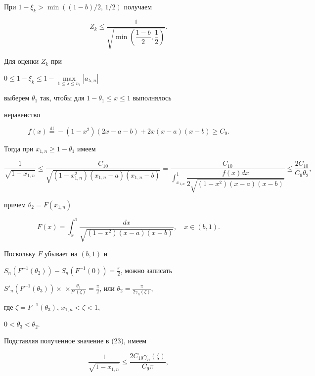 При $1-\xi_k>\min((1-b)/2,\,1/2)$ получаем


\begin{equation}


Z_k\le\frac{1}{\sqrt{\min\left(\dfrac{1-b}{2},\dfrac{1}{2}\right)}}.


\end{equation}


Для оценки $Z_k$ при


$0\le 1-\xi_k\le 1-\max\limits_{1\le\lambda\le n_1}|a_{\lambda,n}|$


выберем $\theta_1$ так, чтобы для $1-\theta_1\le x\le 1$ выполнялось


неравенство


$$


f(x)\overset{\text{df}}{=}{}-(1-x^2)(2x-a-b)+2x(x-a)(x-b)\ge C_9.


$$


Тогда при $x_{1,n}\ge 1-\theta_1$ имеем


\begin{equation}


\frac{1}{\sqrt{1-x_{1,n}}}\le


\frac{C_{10}}{\sqrt{(1-x^2_{1,n})(x_{1,n}-a)(x_{1,n}-b)}}=


\frac{C_{10}}{\displaystyle\int^1_{x_{1,n}}\dfrac{f(x)dx}


{2\sqrt{(1-x^2)(x-a)(x-b)}}}\le\frac{2C_{10}}{C_9\theta_2},


\end{equation}


причем $\theta_2=F(x_{1,n})$


$$


F(x)=\int^1_x\frac{dx}{\sqrt{(1-x^2)(x-a)(x-b)}},\quad x\in(b,1).


$$


Поскольку $F$ убывает на $(b,1)$ и


$S_n(F^{-1}(\theta_2))-S_n(F^{-1}(0))=\frac{\pi}{2}$, можно записать


$S'_n(F^{-1}(\theta_3))\times$ $\times\frac{\theta_2}{F'(\zeta)}=


\frac{\pi}{2}$, или $\theta_2=\frac{\pi}{2\gamma_n(\zeta)}$,


где $\zeta=F^{-1}(\theta_3)$, $x_{1,n}<\zeta<1$,


$0<\theta_3<\theta_2$.





Подставляя полученное значение в (23), имеем


\begin{equation}


\frac{1}{\sqrt{1-x_{1,n}}}\le\frac{2C_{10}\gamma_n(\zeta)}


{C_9\pi},


\end{equation}



